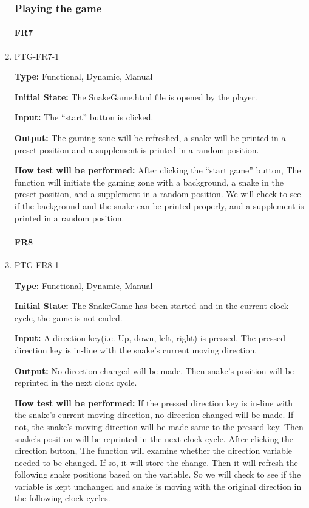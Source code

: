 \documentclass[12pt, titlepage]{article}
\begin{document}
\begin{enumerate}
\subsubsection{Playing the game}

\paragraph{FR7}
\item{PTG-FR7-1\\}

\textbf{Type:} Functional, Dynamic, Manual

\textbf{Initial State:} The SnakeGame.html file is opened by the player.

\textbf{Input:} The ``start'' button is clicked.
 
\textbf{Output:} The gaming zone will be refreshed, a snake  will be printed in a preset position and a supplement is printed in a random position.

\textbf{How test will be performed:} After clicking the ``start game'' button, The function will initiate the gaming zone with a background, a snake in the preset position, and a supplement in a random position. We will check to see if the background and the snake can be printed properly, and a supplement is printed in a random position. 
\paragraph{FR8}
\item{PTG-FR8-1\\}

\textbf{Type:} Functional, Dynamic, Manual

\textbf{Initial State:} The SnakeGame has been started and in the current clock cycle, the game is not ended.

\textbf{Input:} A direction key(i.e. Up, down, left, right) is pressed. The pressed direction key is in-line with the snake's current moving direction.
 
\textbf{Output:} No direction changed will be made. Then snake's position will be reprinted in the next clock cycle.

\textbf{How test will be performed:} If the pressed direction key is in-line with the snake's current moving direction, no direction changed will be made. If not, the snake's moving direction will be made same to the pressed key. Then snake's position will be reprinted in the next clock cycle. After clicking the direction button, The function will examine whether the direction variable needed to be changed. If so, it will store the change. Then it will refresh the following snake positions based on the variable. So we will check to see if the variable is kept unchanged and snake is moving with the original direction in the following clock cycles.


\end{enumerate}
\end{document}
